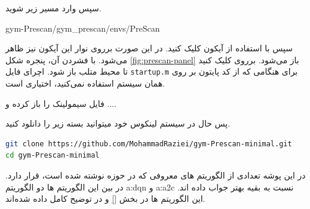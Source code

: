سپس وارد مسیر زیر شوید.
\begin{center}
\begin{latin}
gym-Prescan/gym\_prescan/envs/PreScan
\end{latin}
\end{center}

سپس با استفاده از آیکون 
کلیک کنید. در این صورت برروی نوار  این آیکون نیز ظاهر می‌شود. با فشردن آن،
 پنجره شکل 
\ref{fig:prescan-panel}
باز می‌شود. برروی  کلیک کنید تا محیط متلب باز شود. اچرای فایل \texttt{startup.m} برای هنگامی که از کد پایتون بر روی همان سیستم استفاده نمی‌کنید، اختیاری است. 

فایل سیمولینک را باز کرده و ....



پس حال در سیستم لینکوس خود میتوانید بسته زیر را دانلود کنید.

\begin{latin}
\begin{lstlisting}[language=bash]
git clone https://github.com/MohammadRaziei/gym-Prescan-minimal.git
cd gym-Prescan-minimal
\end{lstlisting}
\end{latin}

در این پوشه تعدادی از الگوریتم های معروفی که در حوزه  نوشته شده است، قرار دارد.
در بین این الگوریتم ها دو الگوریتم \gls{a:dqn} و \gls{a:a2c} نسبت به بقیه بهتر جواب داده اند. این الگوریتم ها در بخش 
\ref{}
و در 
\cite{stable-baselines}
توضیح کامل داده شده‌اند.


























